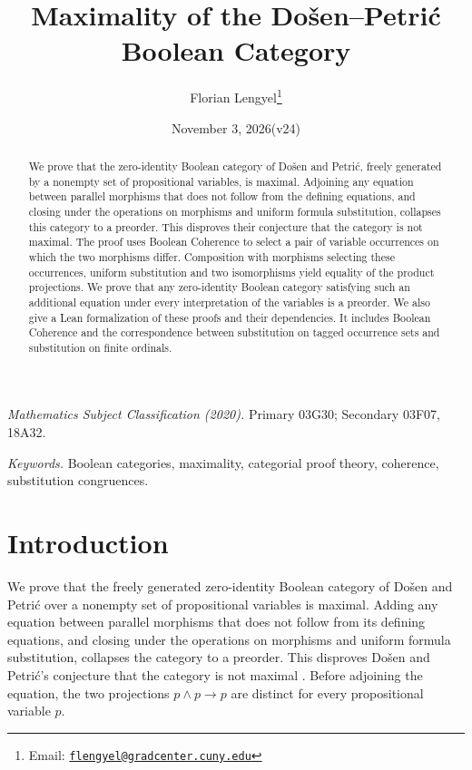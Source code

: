 \documentclass[11pt]{article}
\title{Maximality of the Do\v{s}en--Petri\'c Boolean Category}
\author{Florian Lengyel\thanks{Email: \href{mailto:flengyel@gradcenter.cuny.edu}{\texttt{flengyel@gradcenter.cuny.edu}}}}
\date{November 3, 2026\quad(v24)}
\begin{document}
\maketitle

\begin{abstract}
We prove that the zero-identity Boolean category of Do\v{s}en and
Petri\'c, freely generated by a nonempty set of propositional
variables, is maximal. Adjoining any equation between parallel morphisms that does not follow
from the defining equations, and closing under the operations on morphisms
and uniform formula substitution, collapses this category to a preorder.
This disproves their conjecture that the category is not maximal.
The proof uses Boolean Coherence to select a pair of variable
occurrences on which the two morphisms differ. Composition with morphisms
selecting these occurrences, uniform substitution and two
isomorphisms yield equality of the product projections. We
prove that any zero-identity Boolean category satisfying such an
additional equation under every interpretation of the variables is
a preorder. We also give a Lean formalization of these proofs and
their dependencies. It includes Boolean Coherence and the
correspondence between substitution on tagged occurrence sets and
substitution on finite ordinals.
\end{abstract}

\medskip
\noindent\textit{Mathematics Subject Classification (2020).}
Primary 03G30; Secondary 03F07, 18A32.

\smallskip
\noindent\textit{Keywords.} Boolean categories, maximality, categorial proof theory,
coherence, substitution congruences.

\section{Introduction}

We prove that the freely generated zero-identity Boolean category of
Do\v{s}en and Petri\'c over a nonempty set of propositional variables
is maximal. Adding any equation between parallel morphisms that does
not follow from its defining equations, and closing under the operations on
morphisms and uniform formula substitution, collapses the category
to a preorder. This disproves Do\v{s}en and Petri\'c's conjecture that the category
is not maximal \cite[\S14.2, p.~322]{DP}. Before adjoining the equation, the
two projections $p\wedge p\to p$ are distinct for every
propositional variable $p$.
\end{document}
